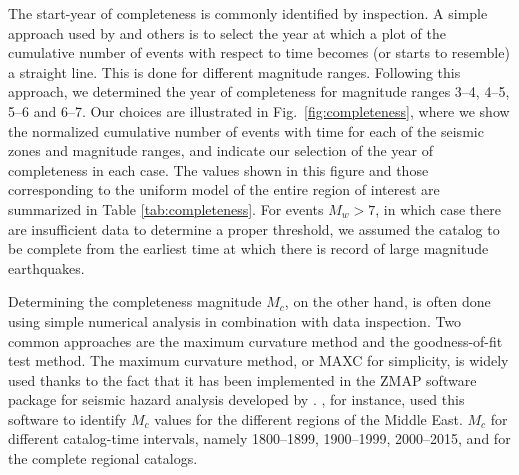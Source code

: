 The start-year of completeness is commonly identified by inspection. A simple approach used by \citet{Frankel1995} and others is to select the year at which a plot of the cumulative number of events with respect to time becomes (or starts to resemble) a straight line. This is done for different magnitude ranges. Following this approach, we determined the year of completeness for magnitude ranges 3--4, 4--5, 5--6 and 6--7. Our choices are illustrated in Fig.~\ref{fig:completeness}, where we show the normalized cumulative number of events with time for each of the seismic zones and magnitude ranges, and indicate our selection of the year of completeness in each case. The values shown in this figure and those corresponding to the uniform model of the entire region of interest are summarized in Table \ref{tab:completeness}. For events $M_w>7$, in which case there are insufficient data to determine a proper threshold, we assumed the catalog to be complete from the earliest time at which there is record of large magnitude earthquakes.


Determining the completeness magnitude $M_c$, on the other hand, is often done using simple numerical analysis in combination with data inspection. Two common approaches are the maximum curvature method and the goodness-of-fit test method. The maximum curvature method, or MAXC for simplicity, is widely used thanks to the fact that it has been implemented in the ZMAP software package for seismic hazard analysis developed by \citet{Wiemer2001}. \citet{Zare2014}, for instance, used this software to identify $M_c$ values for the different regions of the Middle East.  $M_c$ for different catalog-time intervals, namely 1800--1899, 1900--1999, 2000--2015, and for the complete regional catalogs.

